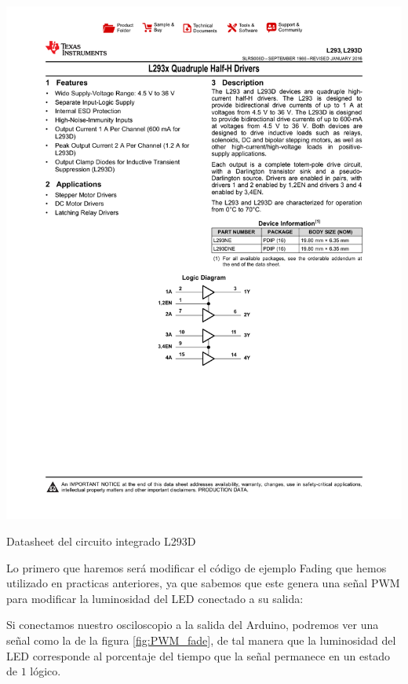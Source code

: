 		\begin{marginfigure}
			\begin{center}
				\includegraphics[width=\textwidth]{images/por_data.pdf}
				\caption{Datasheet del circuito integrado L293D}
				\label{fig:data}
			\end{center}
		\end{marginfigure}

		Lo primero que haremos será modificar el código de ejemplo Fading que hemos utilizado en practicas anteriores, ya que sabemos que este genera una señal PWM para modificar la luminosidad del LED conectado a su salida:

		

		Si conectamos nuestro osciloscopio a la salida del Arduino, podremos ver una señal como la de la figura \ref{fig:PWM_fade}, de tal manera que la luminosidad del LED corresponde al porcentaje del tiempo que la señal permanece en un estado de $1$ lógico.

